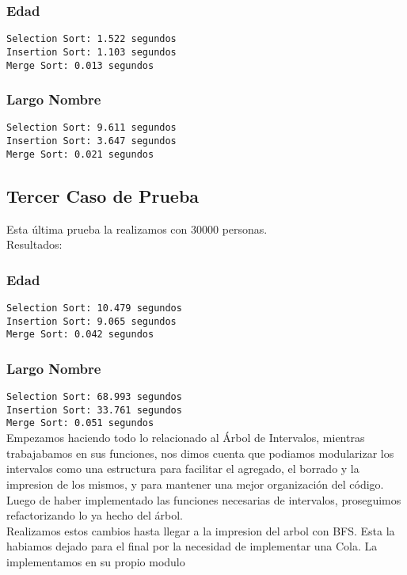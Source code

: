 \documentclass[]{article}
\begin{document}
\subsubsection{Edad}
\verb|Selection Sort: 1.522 segundos|\\
\verb|Insertion Sort: 1.103 segundos|\\
\verb|Merge Sort: 0.013 segundos|\\
\subsubsection{Largo Nombre}
\verb|Selection Sort: 9.611 segundos|\\
\verb|Insertion Sort: 3.647 segundos|\\
\verb|Merge Sort: 0.021 segundos|\\

\subsection{Tercer Caso de Prueba}
Esta última prueba la realizamos con 30000 personas.\\
Resultados:

\subsubsection{Edad}
\verb|Selection Sort: 10.479 segundos|\\
\verb|Insertion Sort: 9.065 segundos|\\
\verb|Merge Sort: 0.042 segundos|\\
\subsubsection{Largo Nombre}
\verb|Selection Sort: 68.993 segundos|\\
\verb|Insertion Sort: 33.761 segundos|\\
\verb|Merge Sort: 0.051 segundos|\\

Empezamos haciendo todo lo relacionado al Árbol de Intervalos, mientras trabajabamos en sus funciones, nos dimos cuenta que podiamos modularizar los intervalos como una estructura para facilitar el agregado, el borrado y la impresion de los mismos, y para mantener una mejor organización del código.\\
Luego de haber implementado las funciones necesarias de intervalos, proseguimos refactorizando lo ya hecho del árbol.\\
Realizamos estos cambios hasta llegar a la impresion del arbol con BFS. Esta la habiamos dejado para el final por la necesidad de implementar una Cola. La implementamos en su propio modulo
\end{document}

